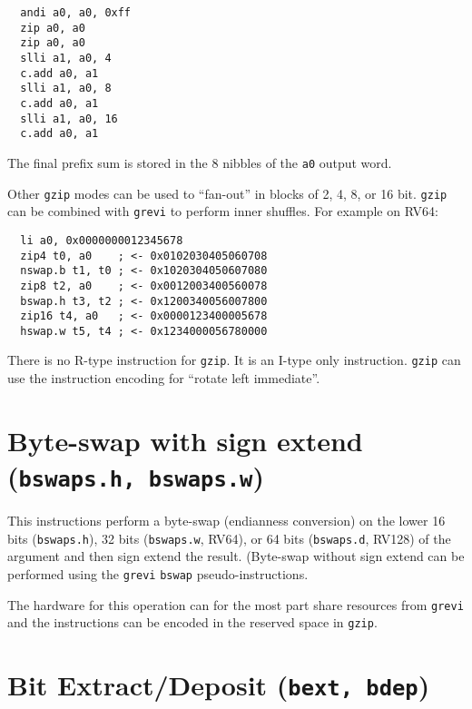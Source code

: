 \begin{verbatim}
  andi a0, a0, 0xff
  zip a0, a0
  zip a0, a0
  slli a1, a0, 4
  c.add a0, a1
  slli a1, a0, 8
  c.add a0, a1
  slli a1, a0, 16
  c.add a0, a1
\end{verbatim}

The final prefix sum is stored in the 8 nibbles of the {\tt a0} output word.

Other {\tt gzip} modes can be used to ``fan-out'' in blocks of 2, 4, 8, or 16 bit.
{\tt gzip} can be combined with {\tt grevi} to perform inner shuffles. For example
on RV64:

\begin{verbatim}
  li a0, 0x0000000012345678
  zip4 t0, a0    ; <- 0x0102030405060708
  nswap.b t1, t0 ; <- 0x1020304050607080
  zip8 t2, a0    ; <- 0x0012003400560078
  bswap.h t3, t2 ; <- 0x1200340056007800
  zip16 t4, a0   ; <- 0x0000123400005678
  hswap.w t5, t4 ; <- 0x1234000056780000
\end{verbatim}



There is no R-type instruction for {\tt gzip}. It is an I-type only instruction.
\texttt{gzip} can use the instruction encoding for ``rotate left immediate''.


\section{Byte-swap with sign extend (\texttt{bswaps.h, bswaps.w})}

This instructions perform a byte-swap (endianness conversion) on the lower 16 bits
(\texttt{bswaps.h}), 32 bits (\texttt{bswaps.w}, RV64), or 64 bits (\texttt{bswaps.d}, RV128)
of the argument and then sign extend the result. (Byte-swap without sign extend can be
performed using the \texttt{grevi} \texttt{bswap} pseudo-instructions.



The hardware for this operation can for the most part share resources from
\texttt{grevi} and the instructions can be encoded in the reserved space in \texttt{gzip}.




\section{Bit Extract/Deposit (\texttt{bext,\ bdep})}

